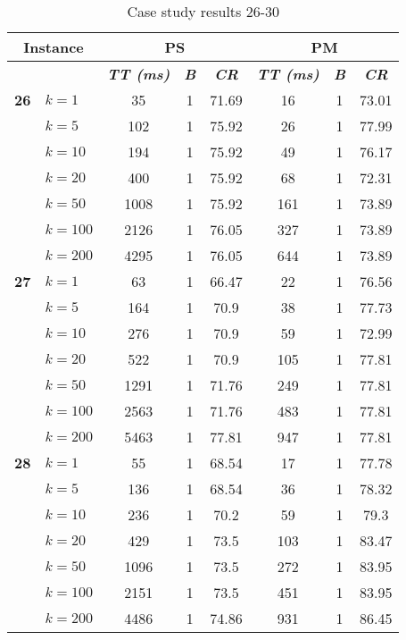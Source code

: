     \begin{table}[htbp]
    \caption{Case study results 26-30}
    \centering
    \begin{tabular}{|l|l|c|c|c|c|c|c|}
    \hline
    \multicolumn{ 2}{|c|}{\textbf{Instance}} & \multicolumn{ 3}{c|}{\textbf{PS}} & \multicolumn{ 3}{c|}{\textbf{PM}} \\ \hline
    \multicolumn{ 2}{|l|}{} & \textbf{\textit{TT (ms)}} & \textbf{\textit{B}} & \textbf{\textit{CR}} & \textbf{\textit{TT (ms)}} & \textbf{\textit{B}} & \textbf{\textit{CR}} \\ \hline
    \multicolumn{1}{|r|}{\textbf{26}} & $k=1$ & 35 & 1 & 71.69 & 16 & 1 & 73.01 \\ 
     & $k=5$ & 102 & 1 & 75.92 & 26 & 1 & 77.99 \\ 
     & $k=10$ & 194 & 1 & 75.92 & 49 & 1 & 76.17 \\ 
     & $k=20$ & 400 & 1 & 75.92 & 68 & 1 & 72.31 \\ 
     & $k=50$ & 1008 & 1 & 75.92 & 161 & 1 & 73.89 \\ 
     & $k=100$ & 2126 & 1 & 76.05 & 327 & 1 & 73.89 \\ 
     & $k=200$ & 4295 & 1 & 76.05 & 644 & 1 & 73.89 \\ \hline
    \multicolumn{1}{|r|}{\textbf{27}} & $k=1$ & 63 & 1 & 66.47 & 22 & 1 & 76.56 \\ 
     & $k=5$ & 164 & 1 & 70.9 & 38 & 1 & 77.73 \\ 
     & $k=10$ & 276 & 1 & 70.9 & 59 & 1 & 72.99 \\ 
     & $k=20$ & 522 & 1 & 70.9 & 105 & 1 & 77.81 \\ 
     & $k=50$ & 1291 & 1 & 71.76 & 249 & 1 & 77.81 \\ 
     & $k=100$ & 2563 & 1 & 71.76 & 483 & 1 & 77.81 \\ 
     & $k=200$ & 5463 & 1 & 77.81 & 947 & 1 & 77.81 \\ \hline
    \multicolumn{1}{|r|}{\textbf{28}} & $k=1$ & 55 & 1 & 68.54 & 17 & 1 & 77.78 \\ 
     & $k=5$ & 136 & 1 & 68.54 & 36 & 1 & 78.32 \\ 
     & $k=10$ & 236 & 1 & 70.2 & 59 & 1 & 79.3 \\ 
     & $k=20$ & 429 & 1 & 73.5 & 103 & 1 & 83.47 \\ 
     & $k=50$ & 1096 & 1 & 73.5 & 272 & 1 & 83.95 \\ 
     & $k=100$ & 2151 & 1 & 73.5 & 451 & 1 & 83.95 \\ 
     & $k=200$ & 4486 & 1 & 74.86 & 931 & 1 & 86.45 \\ \hline

\end{tabular}
\end{table}
